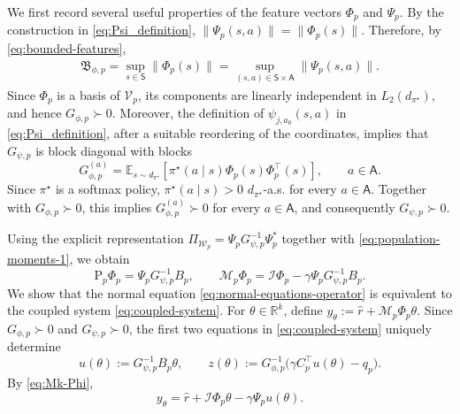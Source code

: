 \documentclass{article}
\theoremstyle{definition}
\theoremstyle{remark}
\theoremstyle{plain}
\newcommand{\E}{\mathbb{E}}
\newcommand{\MKQ}{\mathrm{P}}
\newcommand{\dsieve}{p}
\numberwithin{equation}{section}
\begin{document}
We first record several useful properties of the feature vectors
\(\Phi_\dsieve\) and \(\Psi_\dsieve\). By the construction in
\eqref{eq:Psi_definition},
\(
    \|\Psi_{\dsieve}(s,a)\|
    =
    \|\Phi_{\dsieve}(s)\|.
\)
Therefore, by \eqref{eq:bounded-features},
\begin{align}
\label{eq:psi_bounded_features}
    \mathfrak B_{\phi,\dsieve}
    =
    \sup_{s\in\mathsf S}
    \|\Phi_{\dsieve}(s)\|
    =
    \sup_{(s,a)\in\mathsf S\times\mathsf A}
    \|\Psi_{\dsieve}(s,a)\|.
\end{align}
Since \(\Phi_\dsieve\) is a basis of \(\mathcal V_\dsieve\), its components are
linearly independent in \(L_2(d_{\pi^\star})\), and hence
\(G_{\phi,\dsieve}\succ0\). Moreover, the definition of
\(\psi_{j,a_0}(s,a)\) in \eqref{eq:Psi_definition}, after a suitable reordering
of the coordinates, implies that \(G_{\psi,\dsieve}\) is block diagonal with
blocks
\[
    G_{\phi,\dsieve}^{(a)}
    =
    \E_{s\sim d_{\pi^\star}}
    \left[
        \pi^\star(a\mid s)
        \Phi_\dsieve(s)\Phi_\dsieve^\top(s)
    \right],
    \qquad a\in\mathsf A.
\]
Since \(\pi^\star\) is a softmax policy,
\(\pi^\star(a\mid s)>0\) \(d_{\pi^\star}\)-a.s. for every
\(a\in\mathsf A\). Together with \(G_{\phi,\dsieve}\succ0\), this implies
\(G_{\phi,\dsieve}^{(a)}\succ0\) for every \(a\in\mathsf A\), and consequently
\(G_{\psi,\dsieve}\succ0\).

Using the explicit representation
\(
    \Pi_{\mathcal{W}_\dsieve}
    =
    \Psi_\dsieve G_{\psi,\dsieve}^{-1}\Psi_\dsieve^\ast
\)
together with \eqref{eq:population-moments-1}, we obtain
\begin{equation}
\label{eq:Mk-Phi}
    \MKQ_\dsieve\Phi_\dsieve
    =
    \Psi_\dsieve G_{\psi,\dsieve}^{-1}B_\dsieve,
    \qquad
    \mathcal M_\dsieve\Phi_\dsieve
    =
    \mathcal I\Phi_\dsieve
    -
    \gamma\Psi_\dsieve G_{\psi,\dsieve}^{-1}B_\dsieve.
\end{equation}
We show that the normal equation \eqref{eq:normal-equations-operator} is equivalent to the coupled system \eqref{eq:coupled-system}. For \(\theta\in\mathbb R^k\), define
\(
    y_\theta
    :=
    \widehat r+\mathcal M_\dsieve\Phi_\dsieve\theta.
\)
Since  \(G_{\phi,\dsieve}\succ0\) and \(G_{\psi,\dsieve}\succ0\), the first two equations in 
\eqref{eq:coupled-system} uniquely determine
\begin{equation}
\label{eq:appendix-u-z}
    u(\theta)
    :=
    G_{\psi,\dsieve}^{-1}B_\dsieve\theta,
    \qquad
    z(\theta)
    :=
    G_{\phi,\dsieve}^{-1}
    \bigl(
        \gamma C_\dsieve^\top u(\theta)-q_\dsieve
    \bigr).
\end{equation}
By \eqref{eq:Mk-Phi},
\begin{equation}
\label{eq:appendix-y-theta}
    y_\theta
    =
    \widehat r
    +
    \mathcal I\Phi_\dsieve\theta
    -
    \gamma\Psi_\dsieve u(\theta).
\end{equation}
\end{document}
